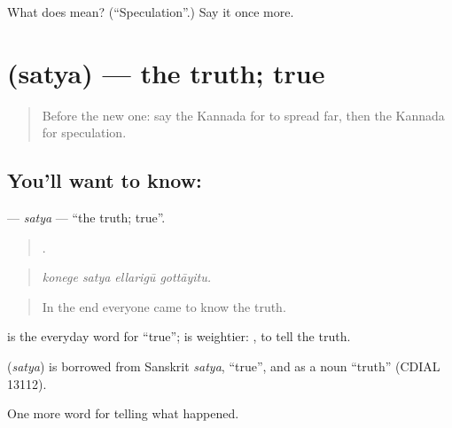 \begin{tcolorbox}[breakable,colback=teal!4,colframe=teal!35!black,title={Before you move on}]
What does  mean? (\textquotedblleft{}Speculation\textquotedblright{}.) Say it once more.
\end{tcolorbox}
\section[\texorpdfstring{\kn{ಸತ್ಯ} (satya)}{ಸತ್ಯ (satya)}]{ (satya) — the truth; true}

\label{lesson:KA-C338-satya}



\begin{quote}
Before the new one: say the Kannada for to spread far, then the Kannada for speculation.
\end{quote}

\subsection*{You'll want to know: }
\textbf{} — \emph{satya} — \textquotedblleft{}the truth; true\textquotedblright{}.

\begin{quote}
   .
\end{quote}

\begin{quote}
\emph{konege satya ellarigū gottāyitu.}
\end{quote}

\begin{quote}
In the end everyone came to know the truth.
\end{quote}

 is the everyday word for \textquotedblleft{}true\textquotedblright{};  is weightier:  , to tell the truth.

\begin{cousinweb}
\textbf{} (\emph{satya}) is borrowed from Sanskrit \emph{satya}, \textquotedblleft{}true\textquotedblright{}, and as a noun \textquotedblleft{}truth\textquotedblright{} (CDIAL 13112).
\end{cousinweb}

\begin{grammarlens}[title={What you've built}]
One more word for telling what happened.
\end{grammarlens}

